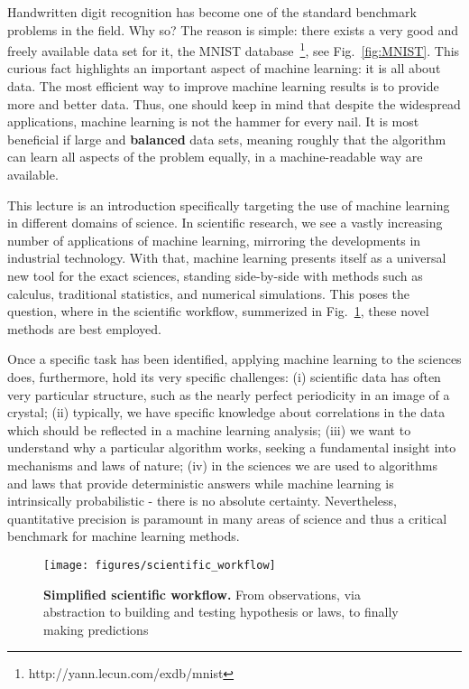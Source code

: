 Handwritten digit recognition has become one of the standard benchmark problems in the field. Why so? The reason is simple: there exists a very good and freely available data set for it, the MNIST database~\footnote{http://yann.lecun.com/exdb/mnist}, see Fig.~\ref{fig:MNIST}. This curious fact highlights an important aspect of machine learning: it is all about data. The most efficient way to improve machine learning results is to provide more and better data. Thus, one should keep in mind that despite the widespread applications, machine learning is not the hammer for every nail. It is most beneficial if large and \textbf{balanced} data sets, meaning roughly that the algorithm can learn all aspects of the problem equally,  in a machine-readable way are available.

This lecture is an introduction specifically targeting the use of machine learning in different domains of science. In scientific research, we see a vastly increasing number of applications of machine learning, mirroring the developments in industrial technology.
With that, machine learning presents itself as a universal new tool for the exact sciences, standing side-by-side with methods such as calculus, traditional statistics, and numerical simulations. This poses the question, where in the scientific workflow, summerized in Fig.~\ref{fig:scientific_workflow}, these novel methods are best employed.


Once a specific task has been identified, applying machine learning to the sciences does, furthermore, hold its very specific challenges: (i) scientific data has often very particular structure, such as the nearly perfect periodicity in an image of a crystal; (ii) typically, we have specific knowledge about correlations in the data which should be reflected in a machine learning analysis; (iii) we want to understand why a particular algorithm works, seeking a fundamental insight into mechanisms and laws of nature; (iv) in the sciences we are used to algorithms and laws that provide deterministic answers while machine learning is intrinsically probabilistic - there is no absolute certainty. Nevertheless, quantitative precision is paramount in many areas of science and thus a critical benchmark for machine learning methods.
\vspace{10pt}

\begin{figure}
  \centering
  \texttt{[image: figures/scientific\_workflow]}
  \caption{{\bf Simplified scientific workflow.} From observations, via abstraction to building and testing hypothesis or laws, to finally making predictions}
  \label{fig:scientific_workflow}
\end{figure}

